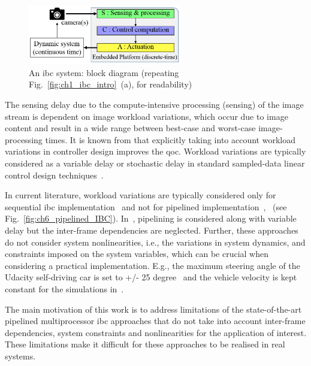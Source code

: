 \begin{figure}[t]
    \centerline{
     \includegraphics[width=0.6\textwidth]{images/IBC_bd2.png}
    }
    \caption{An \gls{ibc} system: block diagram (repeating Fig.~\ref{fig:ch1_ibc_intro}~(a), for readability)}
    \label{fig:ch6_IBC_block_diagram}
     \vspace{-2em}
\end{figure}

The sensing delay due to the compute-intensive processing (sensing) of the image stream is dependent on image workload variations, which occur due to image content and result in a wide range between best-case and worst-case image-processing times.
It is known from \cite{fontantelli2013optimal} that explicitly taking into account workload variations in controller design improves the \gls{qoc}.
Workload variations are typically considered as a variable delay or stochastic delay in standard sampled-data linear control design techniques~\cite{ogata1995discrete}.

In current literature, workload variations are typically considered only for sequential \gls{ibc} implementation~\cite{fontantelli2013optimal} and not for pipelined implementation~\cite{medina2019designing},~\cite{krautgartner1998performance} (see Fig.~\ref{fig:ch6_pipelined_IBC}). 
In~\cite{medina2019implementation}, pipelining is considered along with variable delay but the inter-frame dependencies are neglected.
Further, these approaches do not consider system nonlinearities, i.e., the variations in system dynamics, and constraints imposed on the system variables, which can be crucial when considering a practical implementation. 
E.g., the maximum steering angle of the Udacity self-driving car is set to +/- 25 degree~\cite{tian2018deeptest} and the vehicle velocity is kept constant for the simulations in~\cite{kosecka1997vision}.  

The main motivation of this work is to address limitations of the state-of-the-art pipelined multiprocessor \gls{ibc} approaches that do not take into account inter-frame dependencies, system constraints and nonlinearities for the application of interest.
These limitations make it difficult for these approaches to be realised in real systems. 

